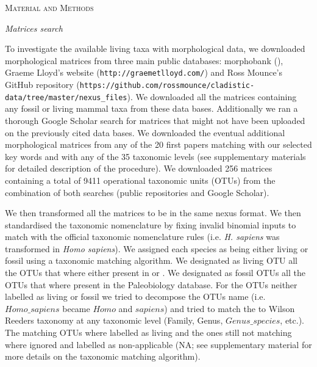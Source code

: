 \documentclass[12pt,letterpaper]{article}
\renewcommand{\section}[1]{%
\bigskip
\begin{center}
\begin{Large}
\normalfont\scshape #1
\medskip
\end{Large}
\end{center}}
\renewcommand{\subsection}[1]{%
\bigskip
\begin{center}
\begin{large}
\normalfont\itshape #1
\end{large}
\end{center}}
\begin{document}
%
%
 
\newpage

\section{Material and Methods}
\subsection{Matrices search}
To investigate the available living taxa with morphological data, we downloaded morphological matrices from three main public databases: morphobank (), Graeme Lloyd's website (\texttt{http://graemetlloyd.com/}) and Ross Mounce's GitHub repository (\texttt{https://github.com/rossmounce/cladistic-data/tree/master/nexus_files}). We downloaded all the matrices containing any fossil or living mammal taxa from these data bases. Additionally we ran a thorough Google Scholar search for matrices that might not have been uploaded on the previously cited data bases. We downloaded the eventual additional morphological matrices from any of the 20 first papers matching with our selected key words and with any of the 35 taxonomic levels (see supplementary materials for detailed description of the procedure). We downloaded 256 %
matrices containing a total of 9411 %
operational taxonomic units (OTUs) from the combination of both searches (public repositories and Google Scholar).

We then transformed all the matrices to be in the same nexus format. We then standardised the taxonomic nomenclature by fixing invalid binomial inputs to match with the official taxonomic nomenclature rules (i.e. \textit{H. sapiens} was transformed in \textit{Homo sapiens}). We assigned each species as being either living or fossil using a taxonomic matching algorithm. We designated as living OTU all the OTUs that where either present in \cite{FritzTree} or \cite{wilson2005mammal}. We designated as fossil OTUs all the OTUs that where present in the Paleobiology database. For the OTUs neither labelled as living or fossil we tried to decompose the OTUs name (i.e. $Homo\_sapiens$ became $Homo$ and $sapiens$) and tried to match the to Wilson Reeders taxonomy at any taxonomic level (Family, Genus, $Genus\_species$, etc.). The matching OTUs where labelled as living and the ones still not matching where ignored and labelled as non-applicable (NA; see supplementary material for more details on the taxonomic matching algorithm).
\end{document}
